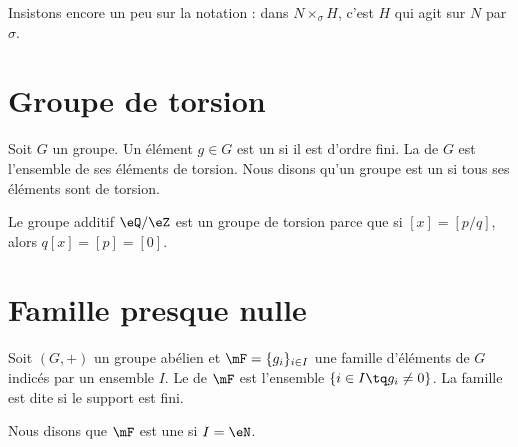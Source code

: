 Insistons encore un peu sur la notation : dans \( N\times_{\sigma}H\), c'est \( H\) qui agit sur \( N\) par \( \sigma\).

\section{Groupe de torsion}

Soit \( G\) un groupe. Un élément \( g\in G\) est un  si il est d'ordre fini. La  de \( G\) est l'ensemble de ses éléments de torsion. Nous disons qu'un groupe est un  si tous ses éléments sont de torsion.

\begin{example}
	Le groupe additif \( \eQ/\eZ\) est un groupe de torsion parce que si \( [x]=[p/q]\), alors \( q[x]=[p]=[0]\).
\end{example}

\section{Famille presque nulle}

Soit \( (G,+)\) un groupe abélien et \( \mF=\{ g_i \}_{i\in I}\) une famille d'éléments de \( G\) indicés par un ensemble \( I\). Le  de \( \mF\) est l'ensemble \( \{ i\in I\tq g_i\neq 0 \}\). La famille est dite  si le support est fini.

Nous disons que \( \mF\) est une  si \( I=\eN\).
